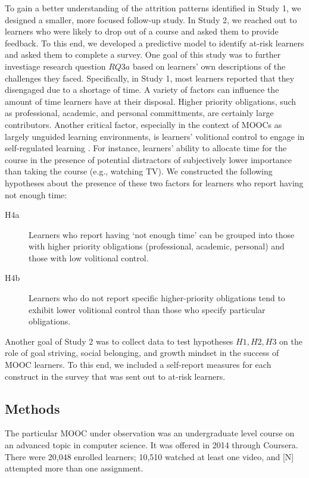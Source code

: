 \documentclass{sigchi}\usepackage[]{graphicx}\usepackage[]{color}
\begin{document}
To gain a better understanding of the attrition patterns identified in Study 1, we designed a smaller, more focused follow-up study. In Study 2, we reached out to learners who were likely to drop out of a course and asked them to provide feedback. To this end, we developed a predictive model to identify at-risk learners and asked them to complete a survey. One goal of this study was to further investiage research question $RQ3a$ based on learners' own descriptions of the challenges they faced. Specifically, in Study 1, most learners reported that they disengaged due to a shortage of time. A variety of factors can influence the amount of time learners have at their disposal. Higher priority obligations, such as professional, academic, and personal committments, are certainly large contributors. Another critical factor, especially in the context of MOOCs as largely unguided learning environments, is learners' volitional control to engage in self-regulated learning \cite{corno2001volitional}. For instance, learners' ability to allocate time for the course in the presence of potential distractors of subjectively lower importance than taking the course (e.g., watching TV). We constructed the following hypotheses about the presence of these two factors for learners who report having not enough time:

\begin{description}
  \item[H4a] Learners who report having `not enough time' can be grouped into those with higher priority obligations (professional, academic, personal) and those with low volitional control.
  \item[H4b] Learners who do not report specific higher-priority obligations tend to exhibit lower volitional control than those who specify particular obligations.
\end{description}  

Another goal of Study 2 was to collect data to test hypotheses $H1, H2, H3$ on the role of goal striving, social belonging, and growth mindset in the success of MOOC learners. To this end, we included a self-report measures for each construct in the survey that was sent out to at-risk learners.

\subsection{Methods}

The particular MOOC under observation was an undergraduate level course on an advanced topic in computer science. It was offered in 2014 through Coursera. There were  20,048 enrolled learners; 10,510 watched at least one video, and [N] attempted more than one assignment.
\end{document}
